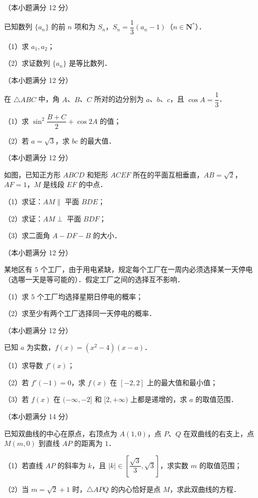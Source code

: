\begin{question}
（本小题满分 12 分）

已知数列 $\{a_n\}$ 的前 $n$ 项和为 $S_n$，$S_n = \dfrac{1}{3}(a_n - 1)$（$n \in \mathbf{N}^*$）．

（1）求 $a_1, a_2$；

（2）求证数列 $\{a_n\}$ 是等比数列．

\end{question}
\begin{question}
（本小题满分 12 分）

在 $\triangle ABC$ 中，角 $A$、$B$、$C$ 所对的边分别为 $a$、$b$、$c$，且 $\cos A = \dfrac{1}{3}$．

（1）求 $\sin^2\dfrac{B+C}{2} + \cos 2A$ 的值；

（2）若 $a = \sqrt{3}$，求 $bc$ 的最大值．

\Needspace{0.4\textheight}
\end{question}
\begin{question}
（本小题满分 12 分）

如图，已知正方形 $ABCD$ 和矩形 $ACEF$ 所在的平面互相垂直，$AB = \sqrt{2}$，$AF = 1$，$M$ 是线段 $EF$ 的中点．

（1）求证：$AM \parallel$ 平面 $BDE$；

（2）求证：$AM \perp$ 平面 $BDF$；

（3）求二面角 $A - DF - B$ 的大小．
\nopagebreak[4]
\begin{center}\end{center}
\nopagebreak[4]
\end{question}
\begin{question}
（本小题满分 12 分）

某地区有 $5$ 个工厂，由于用电紧缺，规定每个工厂在一周内必须选择某一天停电（选哪一天是等可能的）．假定工厂之间的选择互不影响．

（1）求 $5$ 个工厂均选择星期日停电的概率；

（2）求至少有两个工厂选择同一天停电的概率．

\end{question}
\begin{question}
（本小题满分 12 分）

已知 $a$ 为实数，$f(x) = (x^2 - 4)(x - a)$．

（1）求导数 $f'(x)$；

（2）若 $f'(-1) = 0$，求 $f(x)$ 在 $[-2, 2]$ 上的最大值和最小值；

（3）若 $f(x)$ 在 $(-\infty, -2]$ 和 $[2, +\infty)$ 上都是递增的，求 $a$ 的取值范围．

\end{question}
\begin{question}
（本小题满分 14 分）

已知双曲线的中心在原点，右顶点为 $A(1, 0)$，点 $P$、$Q$ 在双曲线的右支上，点 $M(m, 0)$ 到直线 $AP$ 的距离为 $1$．

（1）若直线 $AP$ 的斜率为 $k$，且 $|k| \in \left[\dfrac{\sqrt{3}}{3}, \sqrt{3}\right]$，求实数 $m$ 的取值范围；

（2）当 $m = \sqrt{2} + 1$ 时，$\triangle APQ$ 的内心恰好是点 $M$，求此双曲线的方程．

\end{question}